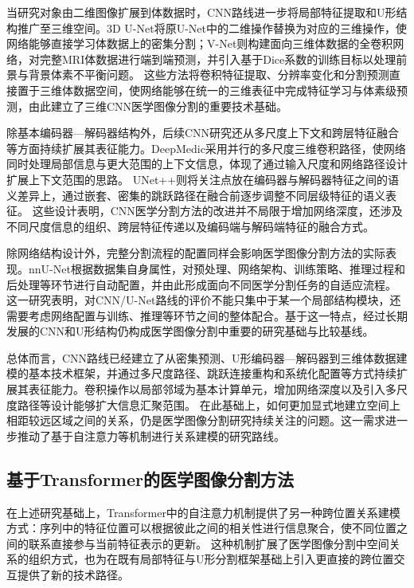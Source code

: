 当研究对象由二维图像扩展到体数据时，CNN路线进一步将局部特征提取和U形结构推广至三维空间。3D U-Net将原U-Net中的二维操作替换为对应的三维操作，使网络能够直接学习体数据上的密集分割；V-Net则构建面向三维体数据的全卷积网络，对完整MRI体数据进行端到端预测，并引入基于Dice系数的训练目标以处理前景与背景体素不平衡问题。\cite{cicek2016threeDunet,milletari2016vnet} 这些方法将卷积特征提取、分辨率变化和分割预测直接置于三维体数据空间，使网络能够在统一的三维表征中完成特征学习与体素级预测，由此建立了三维CNN医学图像分割的重要技术基础。

除基本编码器—解码器结构外，后续CNN研究还从多尺度上下文和跨层特征融合等方面持续扩展其表征能力。DeepMedic采用并行的多尺度三维卷积路径，使网络同时处理局部信息与更大范围的上下文信息，体现了通过输入尺度和网络路径设计扩展上下文范围的思路。\cite{kamnitsas2017deepmedic} UNet++则将关注点放在编码器与解码器特征之间的语义差异上，通过嵌套、密集的跳跃路径在融合前逐步调整不同层级特征的语义表征。\cite{zhou2018unetpp} 这些设计表明，CNN医学分割方法的改进并不局限于增加网络深度，还涉及不同尺度信息的组织、跨层特征传递以及编码端与解码端特征的融合方式。

除网络结构设计外，完整分割流程的配置同样会影响医学图像分割方法的实际表现。nnU-Net根据数据集自身属性，对预处理、网络架构、训练策略、推理过程和后处理等环节进行自动配置，并由此形成面向不同医学分割任务的自适应流程。\cite{isensee2021nnunet} 这一研究表明，对CNN/U-Net路线的评价不能只集中于某一个局部结构模块，还需要考虑网络配置与训练、推理等环节之间的整体配合。基于这一特点，经过长期发展的CNN和U形结构仍构成医学图像分割中重要的研究基础与比较基线。

总体而言，CNN路线已经建立了从密集预测、U形编码器—解码器到三维体数据建模的基本技术框架，并通过多尺度路径、跳跃连接重构和系统化配置等方式持续扩展其表征能力。卷积操作以局部邻域为基本计算单元，增加网络深度以及引入多尺度路径等设计能够扩大信息汇聚范围。\cite{long2015fcn,kamnitsas2017deepmedic} 在此基础上，如何更加显式地建立空间上相距较远区域之间的关系，仍是医学图像分割研究持续关注的问题。这一需求进一步推动了基于自注意力等机制进行关系建模的研究路线。

\subsection{基于Transformer的医学图像分割方法}

在上述研究基础上，Transformer中的自注意力机制提供了另一种跨位置关系建模方式：序列中的特征位置可以根据彼此之间的相关性进行信息聚合，使不同位置之间的联系直接参与当前特征表示的更新。\cite{vaswani2017attention} 这种机制扩展了医学图像分割中空间关系的组织方式，也为在既有局部特征与U形分割框架基础上引入更直接的跨位置交互提供了新的技术路径。

